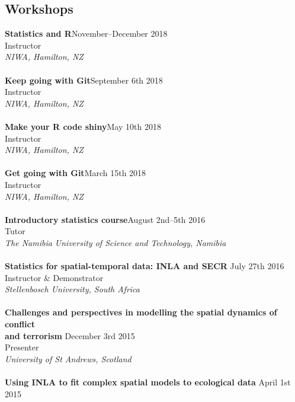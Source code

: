 \documentclass[10pt,letter]{article}
\begin{document}
\subsection*{Workshops}
\vspace{1mm}
{\textbf{Statistics and R}}\hfill November--December 2018\\
Instructor \\
 {\sl NIWA, Hamilton, NZ}\\
 \hdashrule[0.5ex]{4cm}{1pt}{1pt}\\
{\textbf{Keep going with Git}}\hfill September 6th 2018\\
Instructor \\
 {\sl NIWA, Hamilton, NZ}\\
 \hdashrule[0.5ex]{4cm}{1pt}{1pt}\\
{\textbf{Make your R code shiny}}\hfill May 10th 2018\\
Instructor \\
 {\sl NIWA, Hamilton, NZ}\\
 \hdashrule[0.5ex]{4cm}{1pt}{1pt}\\
{\textbf{Get going with Git}}\hfill March 15th 2018\\
Instructor \\
 {\sl NIWA, Hamilton, NZ}\\
 \hdashrule[0.5ex]{4cm}{1pt}{1pt}\\
{\textbf{Introductory statistics course}}\hfill August 2nd--5th 2016\\
Tutor \\
 {\sl The Namibia University of Science and Technology, Namibia}\\
 \hdashrule[0.5ex]{4cm}{1pt}{1pt}\\
 {\textbf{{Statistics for spatial-temporal data: INLA and SECR }}} \hfill July 27th 2016\\
 Instructor \& Demonstrator\\
 {\sl Stellenbosch University, South Africa}\\
 \hdashrule[0.5ex]{4cm}{1pt}{1pt}\\
 {\textbf{{Challenges and perspectives in modelling the spatial dynamics of conflict\\ and terrorism }}} \hfill December 3rd 2015\\
 Presenter\\
 {\sl University of St Andrews, Scotland}\\
 \hdashrule[0.5ex]{4cm}{1pt}{1pt}\\
{\textbf{{Using INLA to fit complex spatial models to ecological data }}} \hfill April 1st 2015\\
\end{document}
